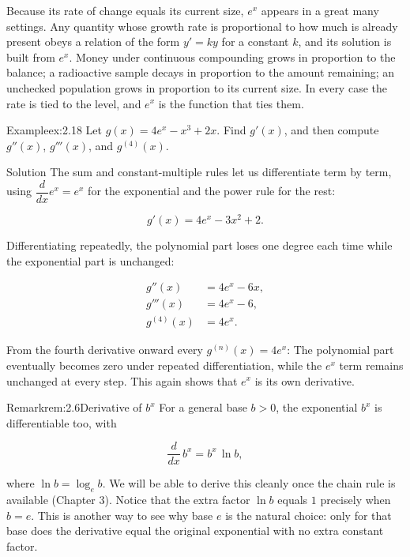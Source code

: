 \documentclass[a4paper,12pt,oneside]{memoir}
\begin{document}
Because its rate of change equals its current size, \(e^{x}\) appears in a great many settings. Any quantity whose growth rate is proportional to how much is already present obeys a relation of the form \(y' = ky\) for a constant \(k\), and its solution is built from \(e^{x}\). Money under continuous compounding grows in proportion to the balance; a radioactive sample decays in proportion to the amount remaining; an unchecked population grows in proportion to its current size. In every case the rate is tied to the level, and \(e^{x}\) is the function that ties them.

\begin{workedexample}
\begin{envexample}{Example}{ex:2.18}{}
Let \(g(x) = 4e^{x} - x^{3} + 2x\). Find \(g'(x)\), and then compute \(g''(x)\), \(g'''(x)\), and \(g^{(4)}(x)\).
\end{envexample}
\begin{envsolution}{Solution}{}{}
The sum and constant-multiple rules let us differentiate term by term, using \(\dfrac{d}{dx}e^{x} = e^{x}\) for the exponential and the power rule for the rest:

\[ g'(x) = 4e^{x} - 3x^{2} + 2. \]

Differentiating repeatedly, the polynomial part loses one degree each time while the exponential part is unchanged:

\[ \begin{aligned}
          g''(x)   &= 4e^{x} - 6x, \\[2pt]
          g'''(x)  &= 4e^{x} - 6, \\[2pt]
          g^{(4)}(x) &= 4e^{x}.
        \end{aligned} \]

From the fourth derivative onward every \(g^{(n)}(x) = 4e^{x}\): The polynomial part eventually becomes zero under repeated differentiation, while the \(e^{x}\) term remains unchanged at every step. This again shows that \(e^{x}\) is its own derivative.
\end{envsolution}
\end{workedexample}
\begin{envremark}{Remark}{rem:2.6}{Derivative of \(b^{x}\)}
For a general base \(b > 0\), the exponential \(b^{x}\) is differentiable too, with

\[ \frac{d}{dx}\,b^{x} = b^{x}\,\ln b, \]

where \(\ln b = \log_{e} b\). We will be able to derive this cleanly once the chain rule is available (Chapter 3). Notice that the extra factor \(\ln b\) equals \(1\) precisely when \(b = e\). This is another way to see why base \(e\) is the natural choice: only for that base does the derivative equal the original exponential with no extra constant factor.
\end{envremark}
\end{document}
